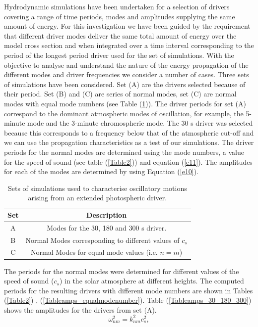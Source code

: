 \documentclass[preprint,authoryear,12pt]{elsarticle}
\begin{document}
Hydrodynamic simulations have been undertaken for a selection of drivers covering a range of time periods, modes and amplitudes supplying the same amount of energy. For this investigation we have been guided by the requirement that  different driver modes deliver the same total amount of energy over the model cross section and when integrated over a time interval corresponding to the period of the longest period driver used for the set of simulations. With the objective to analyse and understand the nature of the energy propagation of the different modes and driver frequencies we consider a number of cases.   Three sets of simulations have been considered. Set (A) are the drivers selected because of their period. Set (B) and (C) are series of normal modes, set (C) are normal modes with equal mode numbers (see Table (\ref{Table1})). 
The driver periods for set (A) correspond to the dominant atmospheric modes of oscillation, for example, the 5-minute mode and the 3-minute chromospheric mode. The 30 s driver was selected because this corresponds to a frequency below that of the atmospheric cut-off and we can use the propagation characteristics as a test of our simulations. The driver periods for the normal modes are determined using the mode numbers, a value for the speed of sound (see table (\ref{Table2})) and equation (\ref{e11}). The amplitudes for each of the modes are determined by using  Equation (\ref{e10}). 
\begin{table}
\centering
\begin{tabular}{c c }
\hline
Set   &  Description\\
\hline
A &  Modes for the 30, 180 and 300 s driver. \\
\hline
B &  Normal Modes corresponding to different values of $c_s$ \\
\hline
C & Normal Modes for equal mode values (i.e. $n=m$)  \\
\hline
\end{tabular} 
\caption{Sets of simulations used to characterise oscillatory motions arising from an extended photospheric driver.}
\label{Table1}
\end{table}
The periods for the normal modes were determined for different values of the speed of sound ($c_s$) in the solar atmosphere at different heights. The computed periods for the resulting drivers with different mode numbers are shown in Tables (\ref{Table2})  ,   (\ref{Tableamps_equalmodenumber}). Table (\ref{Tableamps_30_180_300}) shows the amplitudes for the drivers from set (A). 
\begin{equation}
\omega_{nm}^{2}= k_{nm}^{2}c_{s}^{2},
\label{e11}
\end{equation}
\end{document}
